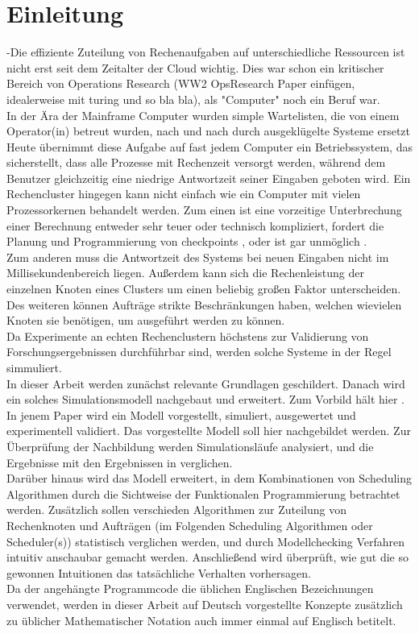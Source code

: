 \chapter{Einleitung}
\label{chap:ein}


-Die effiziente Zuteilung von Rechenaufgaben auf unterschiedliche Ressourcen ist nicht erst seit dem Zeitalter der Cloud wichtig. Dies war schon ein kritischer Bereich von Operations Research (WW2 OpsResearch Paper einfügen, idealerweise mit turing und so bla bla), als "Computer" noch ein Beruf war.\\

In der Ära der Mainframe Computer wurden simple Wartelisten, die von einem Operator(in) betreut wurden, nach und nach durch ausgeklügelte Systeme ersetzt %
Heute übernimmt diese Aufgabe auf fast jedem Computer ein Betriebssystem, das sicherstellt, dass alle Prozesse mit Rechenzeit versorgt werden, während dem Benutzer gleichzeitig eine niedrige Antwortzeit seiner Eingaben geboten wird. Ein Rechencluster hingegen kann nicht einfach wie ein Computer mit vielen Prozessorkernen behandelt werden. Zum einen ist eine vorzeitige Unterbrechung einer Berechnung entweder sehr teuer oder technisch kompliziert, fordert die Planung und Programmierung von checkpoints \cite{IPS15}, oder ist gar unmöglich \cite{adams1979hitchhiker}.\\
Zum anderen muss die Antwortzeit des Systems bei neuen Eingaben nicht im Millisekundenbereich liegen. Außerdem kann sich die Rechenleistung der einzelnen Knoten eines Clusters um einen beliebig großen Faktor unterscheiden.  Des weiteren können Aufträge strikte Beschränkungen haben, welchen wievielen Knoten sie benötigen, um ausgeführt werden zu können.\\
Da Experimente an echten Rechenclustern höchstens zur Validierung von Forschungsergebnissen durchführbar sind, werden solche Systeme in der Regel simmuliert.\\
In dieser Arbeit werden zunächst relevante Grundlagen geschildert.
Danach wird ein solches Simulationsmodell nachgebaut und erweitert. Zum Vorbild hält hier \cite{Arn99}. In jenem Paper wird ein Modell vorgestellt, simuliert, ausgewertet und experimentell validiert. Das vorgestellte Modell soll hier nachgebildet werden. Zur Überprüfung der Nachbildung werden Simulationsläufe analysiert, und die Ergebnisse mit den Ergebnissen in \cite{Arn99} verglichen.\\
Darüber hinaus wird das Modell erweitert, in dem Kombinationen von Scheduling Algorithmen durch die Sichtweise der Funktionalen Programmierung betrachtet werden.
Zusätzlich sollen verschieden Algorithmen zur Zuteilung von Rechenknoten und Aufträgen (im Folgenden Scheduling Algorithmen oder Scheduler(s)) statistisch verglichen werden, und durch Modellchecking Verfahren intuitiv anschaubar gemacht werden. Anschließend wird überprüft, wie gut die so gewonnen Intuitionen das tatsächliche Verhalten vorhersagen.\\


Da der angehängte Programmcode die üblichen Englischen Bezeichnungen verwendet, werden in dieser Arbeit auf Deutsch vorgestellte Konzepte zusätzlich zu üblicher Mathematischer Notation auch immer einmal auf Englisch betitelt.


